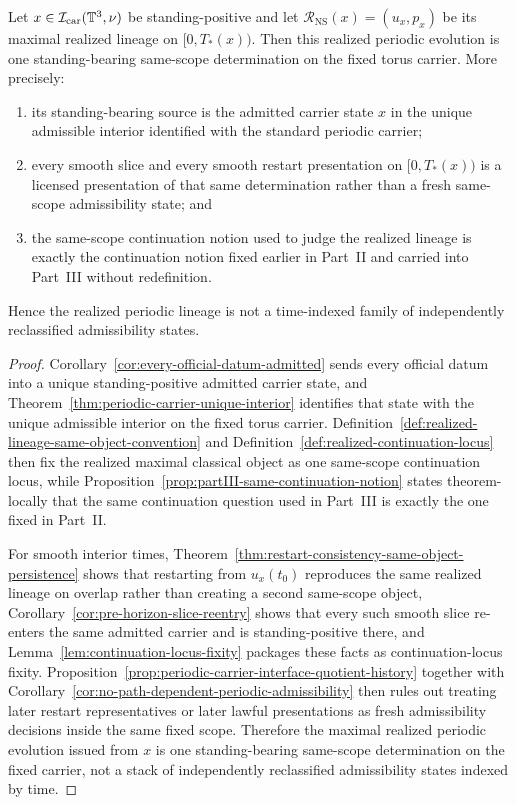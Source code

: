 \begin{manualtheorem}
\label{thm:carrier-to-lineage-binding}
Let $x\in\mathcal I_{\mathrm{car}}(\mathbb{T}^3,\nu)$ be standing-positive and let $\mathcal R_{\mathrm{NS}}(x)=(u_x,p_x)$ be its maximal realized lineage on $[0,T_*(x))$. Then this realized periodic evolution is one standing-bearing same-scope determination on the fixed torus carrier. More precisely:
\begin{enumerate}[label=(\roman*), leftmargin=2.2em]
\item its standing-bearing source is the admitted carrier state $x$ in the unique admissible interior identified with the standard periodic carrier;
\item every smooth slice and every smooth restart presentation on $[0,T_*(x))$ is a licensed presentation of that same determination rather than a fresh same-scope admissibility state; and
\item the same-scope continuation notion used to judge the realized lineage is exactly the continuation notion fixed earlier in Part~II and carried into Part~III without redefinition.
\end{enumerate}
Hence the realized periodic lineage is not a time-indexed family of independently reclassified admissibility states.
\end{manualtheorem}

\begin{proof}
Corollary~\ref{cor:every-official-datum-admitted} sends every official datum into a unique standing-positive admitted carrier state, and Theorem~\ref{thm:periodic-carrier-unique-interior} identifies that state with the unique admissible interior on the fixed torus carrier. Definition~\ref{def:realized-lineage-same-object-convention} and Definition~\ref{def:realized-continuation-locus} then fix the realized maximal classical object as one same-scope continuation locus, while Proposition~\ref{prop:partIII-same-continuation-notion} states theorem-locally that the same continuation question used in Part~III is exactly the one fixed in Part~II.

For smooth interior times, Theorem~\ref{thm:restart-consistency-same-object-persistence} shows that restarting from $u_x(t_0)$ reproduces the same realized lineage on overlap rather than creating a second same-scope object, Corollary~\ref{cor:pre-horizon-slice-reentry} shows that every such smooth slice re-enters the same admitted carrier and is standing-positive there, and Lemma~\ref{lem:continuation-locus-fixity} packages these facts as continuation-locus fixity. Proposition~\ref{prop:periodic-carrier-interface-quotient-history} together with Corollary~\ref{cor:no-path-dependent-periodic-admissibility} then rules out treating later restart representatives or later lawful presentations as fresh admissibility decisions inside the same fixed scope. Therefore the maximal realized periodic evolution issued from $x$ is one standing-bearing same-scope determination on the fixed carrier, not a stack of independently reclassified admissibility states indexed by time.
\end{proof}


